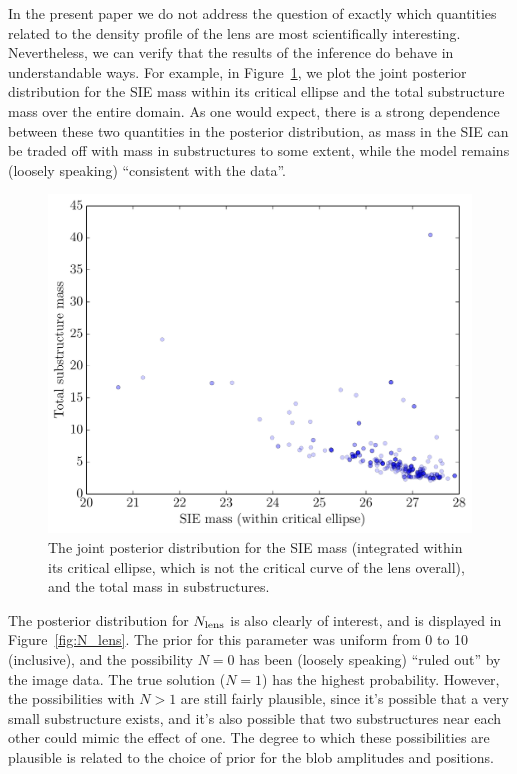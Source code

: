 \documentclass[useAMS,usenatbib]{mn2e}
\begin{document}
In the present paper we do not address the question of exactly which quantities
related to the
density profile of the lens are most scientifically interesting. Nevertheless,
we can verify that the results of the inference do behave in understandable
ways. For example, in Figure~\ref{fig:simdata_masses},
we plot the joint posterior distribution
for the SIE mass within its critical ellipse and the total substructure mass
over the entire domain. As one would expect, there is a strong dependence
between these two quantities in the posterior distribution, as mass in the
SIE can be traded off with mass in substructures to some extent, while
the model remains (loosely speaking) ``consistent with the data''.
\begin{figure}
\begin{center}
\includegraphics[scale=0.4]{simdata_masses.pdf}
\caption{The joint posterior distribution for the SIE mass (integrated within
its critical ellipse, which is not the critical curve of the lens overall),
and the total mass in substructures.\label{fig:simdata_masses}}
\end{center}
\end{figure}

The posterior distribution for $N_{\rm lens}$ is also clearly of interest, and
is displayed in Figure~\ref{fig:N_lens}. The prior for this parameter was
uniform from 0 to 10 (inclusive), and the possibility $N=0$ has been
(loosely speaking) ``ruled out'' by the image data. The true solution ($N=1$)
has the highest probability. However, the possibilities with $N > 1$ are
still fairly plausible, since it's possible that a very small substructure
exists, and it's also possible that two substructures near each other could
mimic the effect of one. The degree to which these possibilities are plausible
is related to the choice of prior for the blob amplitudes and positions.
\end{document}
